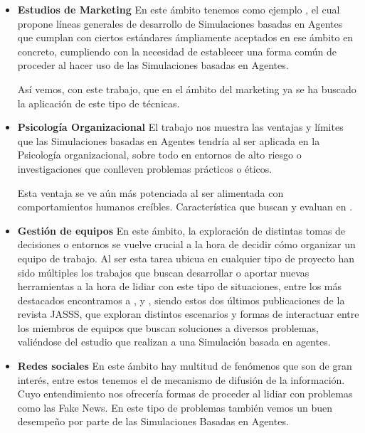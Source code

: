 \begin{itemize}
	\item \textbf{Estudios  de Marketing} En este ámbito tenemos como ejemplo \cite{rand2011agent}, el cual propone líneas generales de desarrollo de Simulaciones basadas en Agentes que cumplan con ciertos estándares ámpliamente aceptados en ese ámbito en concreto, cumpliendo con la necesidad de establecer una forma común de proceder al hacer uso de las Simulaciones basadas en Agentes.

Así vemos, con este trabajo, que en el ámbito del marketing ya se ha buscado la aplicación de este tipo de técnicas.
	\item \textbf{Psicología Organizacional} El trabajo \cite{hughes2012agent} nos muestra las ventajas y límites que las Simulaciones basadas en Agentes tendría al ser aplicada en la Psicología organizacional, sobre todo en entornos de alto riesgo o investigaciones que conlleven problemas prácticos o éticos.

Esta ventaja se ve aún más potenciada al ser alimentada con comportamientos humanos creíbles. Característica que buscan y evaluan en \cite{park2023generative}.
	\item \textbf{Gestión de equipos} En este ámbito, la exploración de distintas tomas de decisiones o entornos se vuelve crucial a la hora de decidir cómo organizar un equipo de trabajo. Al ser esta tarea ubicua en cualquier tipo de proyecto han sido múltiples los trabajos que buscan desarrollar o aportar nuevas herramientas a la hora de lidiar con este tipo de situaciones, entre los más destacados encontramos a \cite{crowder2012development}, \cite{boroomand2021hard} y \cite{boroomand2023superiority}, siendo estos dos últimos publicaciones de la revista JASSS, que exploran distintos escenarios y formas de interactuar entre los miembros de equipos que buscan soluciones a diversos problemas, valiéndose del estudio que realizan a una Simulación basada en agentes.
	\item \textbf{Redes sociales} En este ámbito hay multitud de fenómenos que son de gran interés, entre estos tenemos el de mecanismo de difusión de la información. Cuyo entendimiento nos ofrecería formas de proceder al lidiar con problemas como las Fake News. En este tipo de problemas también vemos un buen desempeño por parte de las Simulaciones Basadas en Agentes.


\end{itemize}
